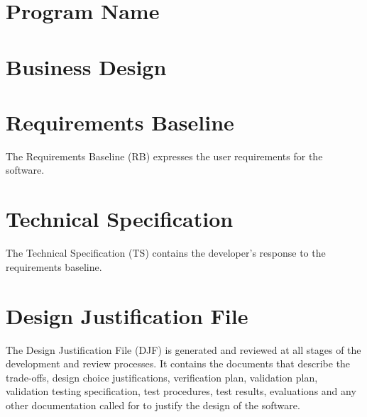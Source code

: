 
\chapter{Program Name}\label{sec:PN}



\chapter{Business Design}\label{sec:BD}


\chapter{Requirements Baseline}\label{sec:RB}
The Requirements Baseline (RB) expresses the user requirements for the software.


\chapter{Technical Specification}\label{sec:TS}
The Technical Specification (TS)  contains the developer's response to the
requirements baseline. %


\chapter{Design Justification File}\label{sec:DJF}
The Design Justification File (DJF) is generated and reviewed at all stages of the development
and review processes.  It contains the documents that describe the trade-offs, design choice
justifications, verification plan, validation plan, validation testing specification,
test procedures, test results, evaluations and any other documentation called for to justify
the design of the software.


